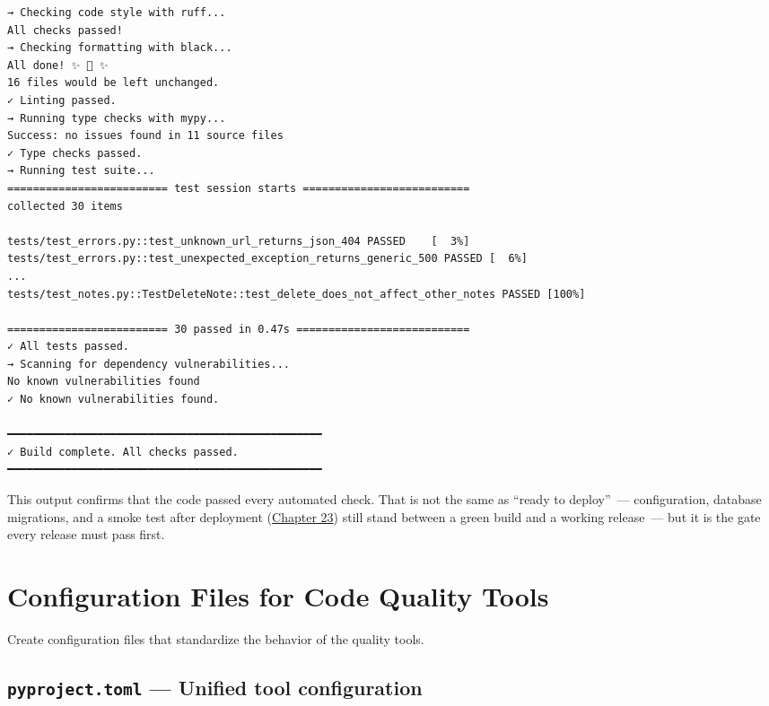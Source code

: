 \begin{diagrambox}[short]{404.7pt}
\begin{Verbatim}[fontsize=\fontsize{8.5}{8.07}\selectfont]
→ Checking code style with ruff...
All checks passed!
→ Checking formatting with black...
All done! ✨ 🍰 ✨
16 files would be left unchanged.
✓ Linting passed.
→ Running type checks with mypy...
Success: no issues found in 11 source files
✓ Type checks passed.
→ Running test suite...
========================= test session starts ==========================
collected 30 items

tests/test_errors.py::test_unknown_url_returns_json_404 PASSED    [  3%]
tests/test_errors.py::test_unexpected_exception_returns_generic_500 PASSED [  6%]
...
tests/test_notes.py::TestDeleteNote::test_delete_does_not_affect_other_notes PASSED [100%]

========================= 30 passed in 0.47s ===========================
✓ All tests passed.
→ Scanning for dependency vulnerabilities...
No known vulnerabilities found
✓ No known vulnerabilities found.

━━━━━━━━━━━━━━━━━━━━━━━━━━━━━━━━━━━━━━━━━━━━━━━━━
✓ Build complete. All checks passed.
━━━━━━━━━━━━━━━━━━━━━━━━━━━━━━━━━━━━━━━━━━━━━━━━━
\end{Verbatim}
\end{diagrambox}

\noindent{}This output confirms that the code passed every automated check. That is not the same as ``ready to deploy''~--- configuration, database migrations, and a smoke test after deployment (\hyperref[ch:23-code-transfer]{Chapter 23}) still stand between a green build and a working release~--- but it is the gate every release must pass first.

\setcounter{section}{5}
\section{Configuration Files for Code Quality Tools}\label{17-build-process:176-configuration-files-for-code-quality-tools}

Create configuration files that standardize the behavior of the quality tools.

\subsection*{\texorpdfstring{\texttt{pyproject.toml} --- Unified tool configuration}{pyproject.toml --- Unified tool configuration}}\label{17-build-process:pyprojecttoml--unified-tool-configuration}


